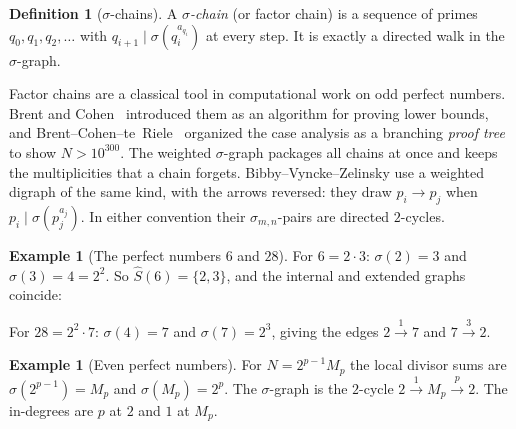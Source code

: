 \documentclass[11pt]{article}
\theoremstyle{definition}
\newtheorem{definition}[theorem]{Definition}
\newtheorem{example}[theorem]{Example}
\theoremstyle{remark}
\begin{document}
\begin{definition}[$\sigma$-chains]
A \emph{$\sigma$-chain} (or factor chain) is a sequence of primes
$q_0,q_1,q_2,\dots$ with $q_{i+1}\mid\sigma(q_i^{a_{q_i}})$ at every step.
It is exactly a directed walk in the $\sigma$-graph.
\end{definition}

Factor chains are a classical tool in computational work on odd perfect
numbers.  Brent and Cohen~\cite{BrentCohen} introduced them as an algorithm
for proving lower bounds, and Brent--Cohen--te~Riele~\cite{BCtR} organized
the case analysis as a branching \emph{proof tree} to show $N>10^{300}$.  The
weighted $\sigma$-graph packages all chains at once and keeps the
multiplicities that a chain forgets.  Bibby--Vyncke--Zelinsky
\cite{BibbyVynckeZelinsky} use a weighted digraph of the same kind, with the
arrows reversed: they draw $p_i\to p_j$ when $p_i\mid\sigma(p_j^{a_j})$.  In
either convention their $\sigma_{m,n}$-pairs are directed $2$-cycles.

\begin{example}[The perfect numbers $6$ and $28$]\label{ex:general6}
For $6=2\cdot3$: $\sigma(2)=3$ and $\sigma(3)=4=2^2$.  So
$\widehat S(6)=\{2,3\}$, and the internal and extended graphs coincide:
\begin{center}
\end{center}
For $28=2^2\cdot7$: $\sigma(4)=7$ and $\sigma(7)=2^3$, giving the edges
$2\xrightarrow{1}7$ and $7\xrightarrow{3}2$.
\end{example}

\begin{example}[Even perfect numbers]\label{ex:even}
For $N=2^{p-1}M_p$ the local divisor sums are $\sigma(2^{p-1})=M_p$ and
$\sigma(M_p)=2^p$.  The $\sigma$-graph is the $2$-cycle
$2\xrightarrow{1}M_p\xrightarrow{p}2$.  The in-degrees are $p$ at $2$ and $1$
at $M_p$.
\end{example}
\end{document}
